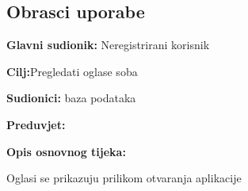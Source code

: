 \eject



\subsection{Obrasci uporabe}




\noindent {}
\begin{packed_item}

	\item \textbf{Glavni sudionik: }Neregistrirani korisnik
	\item  \textbf{Cilj:}Pregledati oglase soba
	\item  \textbf{Sudionici:} baza podataka
	\item  \textbf{Preduvjet:}
	\item  \textbf{Opis osnovnog tijeka:}

	\item[] \begin{packed_enum}

				\item Oglasi se prikazuju prilikom otvaranja aplikacije

	\end{packed_enum}




\end{packed_item}

